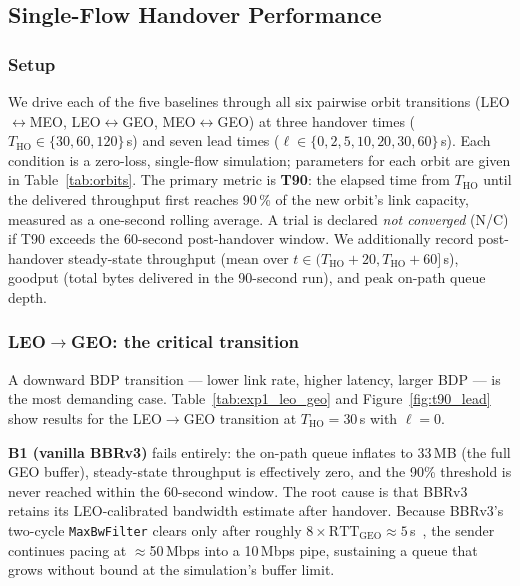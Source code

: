 
\subsection{Single-Flow Handover Performance}
\label{sec:exp1}

\subsubsection{Setup}

We drive each of the five baselines through all six pairwise orbit
transitions (LEO$\leftrightarrow$MEO, LEO$\leftrightarrow$GEO,
MEO$\leftrightarrow$GEO) at three handover times
($T_\mathrm{HO} \in \{30, 60, 120\}$\,s) and seven lead times
($\ell \in \{0, 2, 5, 10, 20, 30, 60\}$\,s).
Each condition is a zero-loss, single-flow simulation; parameters for each
orbit are given in Table~\ref{tab:orbits}.
The primary metric is \textbf{T90}: the elapsed time from
$T_\mathrm{HO}$ until the delivered throughput first reaches
90\,\% of the new orbit's link capacity, measured as a one-second rolling
average.
A trial is declared \emph{not converged} (N/C) if T90 exceeds the
60-second post-handover window.
We additionally record post-handover steady-state throughput
(mean over $t \in (T_\mathrm{HO}+20, T_\mathrm{HO}+60]$\,s),
goodput (total bytes delivered in the 90-second run),
and peak on-path queue depth.

\subsubsection{LEO$\to$GEO: the critical transition}

A downward BDP transition --- lower link rate, higher latency, larger BDP
--- is the most demanding case.
Table~\ref{tab:exp1_leo_geo} and Figure~\ref{fig:t90_lead} show results
for the LEO$\to$GEO transition at $T_\mathrm{HO} = 30$\,s with $\ell = 0$.

\textbf{B1 (vanilla BBRv3)} fails entirely: the on-path queue inflates to
33\,MB (the full GEO buffer), steady-state throughput is effectively zero,
and the 90\% threshold is never reached within the 60-second window.
The root cause is that BBRv3 retains its LEO-calibrated bandwidth estimate
after handover.
Because BBRv3's two-cycle \texttt{MaxBwFilter} clears only after roughly
$8 \times \mathrm{RTT}_\mathrm{GEO} \approx 5$\,s~\cite{cardwell2017},
the sender continues pacing at $\approx$50\,Mbps into a 10\,Mbps pipe,
sustaining a queue that grows without bound at the simulation's buffer limit.

